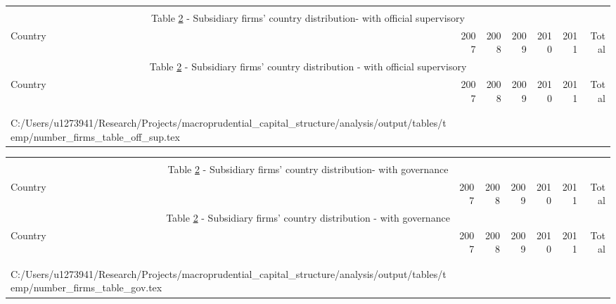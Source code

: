 \documentclass[12pt]{article}
\makeatletter
\newcommand\primitiveinput[1]
{\@@input #1 }
\makeatother
\begin{document}
	\begin{small}
	{
		\begin{longtable}{lrrrrrr}\\
			\label{tab:number of firms}\\
			\multicolumn{7}{c}{Table \ref{tab:number of firms} - Subsidiary firms' country distribution- with official supervisory}\\
			\hline \hline \addlinespace Country & 2007 & 2008 & 2009 & 2010 & 2011 & Total  \\
			\endfirsthead
			\multicolumn{7}{c}{Table \ref{tab:number of firms} - Subsidiary firms' country distribution - with official supervisory}\\
			\hline \hline \addlinespace Country & 2007 & 2008 & 2009 & 2010 & 2011 & Total  \\
			\hline \addlinespace \endhead
			\hline
			\multicolumn{7}{r}{{\textit{(Continued)}}}\\ \endfoot
			\\ 	
			\endlastfoot
			\primitiveinput{C:/Users/u1273941/Research/Projects/macroprudential_capital_structure/analysis/output/tables/temp/number_firms_table_off_sup.tex}
			\hline 			
		\end{longtable}	
	}
\end{small}

	\begin{small}
	{
		\begin{longtable}{lrrrrrr}\\
			\label{tab:number of firms}\\
			\multicolumn{7}{c}{Table \ref{tab:number of firms} - Subsidiary firms' country distribution- with governance}\\
			\hline \hline \addlinespace Country & 2007 & 2008 & 2009 & 2010 & 2011 & Total  \\
			\endfirsthead
			\multicolumn{7}{c}{Table \ref{tab:number of firms} - Subsidiary firms' country distribution - with governance}\\
			\hline \hline \addlinespace Country & 2007 & 2008 & 2009 & 2010 & 2011 & Total  \\
			\hline \addlinespace \endhead
			\hline
			\multicolumn{7}{r}{{\textit{(Continued)}}}\\ \endfoot
			\\ 	
			\endlastfoot
			\primitiveinput{C:/Users/u1273941/Research/Projects/macroprudential_capital_structure/analysis/output/tables/temp/number_firms_table_gov.tex}
			\hline 			
		\end{longtable}	
	}
\end{small}
\end{document}
